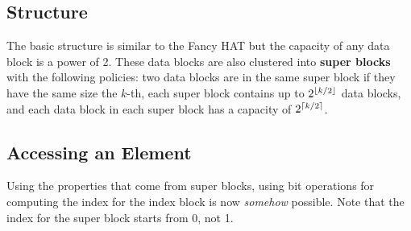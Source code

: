 \subsection*{Structure}

The basic structure is similar to the Fancy HAT but the capacity of any data block is a power of 2.
These data blocks are also clustered into \textbf{super blocks} with the following policies: two
data blocks are in the same super block if they have the same size the $k$-th, each super block
contains up to $2^{\left\lfloor k/2 \right\rfloor}$ data blocks, and each data block in each super block has a 
capacity of $2^{\left\lceil k/2 \right\rceil}$.

\subsection*{Accessing an Element}

Using the properties that come from super blocks, using bit operations for computing the index for
the index block is now \textit{somehow} possible. Note that the index for the super block starts
from 0, not 1.

\endgroup
